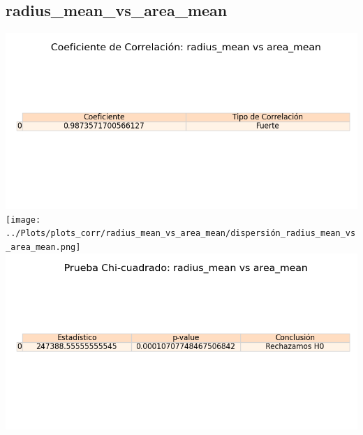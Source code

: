 \documentclass[a4paper, 12pt]{article}
\begin{document}
\subsection{radius\_mean\_vs\_area\_mean}
    \includegraphics[width = \textwidth]{../Plots/plots_corr/radius_mean_vs_area_mean/coeficiente_correlacion_radius_mean_vs_area_mean.png}
    \texttt{[image: ../Plots/plots\_corr/radius\_mean\_vs\_area\_mean/dispersión\_radius\_mean\_vs\_area\_mean.png]}
    \includegraphics[width = \textwidth]{../Plots/plots_corr/radius_mean_vs_area_mean/chi_cuadrado_radius_mean_vs_area_mean.png}
\end{document}

